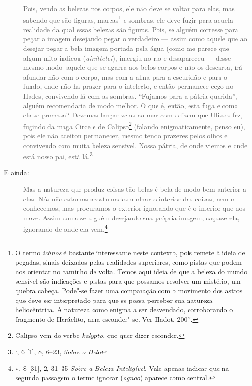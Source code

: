 \begin{quote}
Pois, vendo as belezas nos corpos, ele não deve se voltar para elas,
mas sabendo que são figuras, marcas\footnote{ O termo \emph{ichnos}
é bastante interessante neste contexto, pois remete à ideia de
pegadas, sinais deixados pelas realidades superiores, como pistas que
podem nos orientar no caminho de volta. Temos aqui ideia 
de que a beleza do mundo sensível são indicações e pistas
para que possamos resolver um mistério, um quebra cabeça. Pode"-se
fazer uma comparação com o movimento dos astros que deve ser
interpretado para que se possa perceber sua natureza heliocêntrica. A
natureza como enigma a ser desvendado, corroborando o fragmento de
Heráclito, ama esconder"-se. Ver Hadot, 2007.} e sombras,
ele deve fugir para aquela realidade da qual essas belezas são
figuras. Pois, se alguém corresse para pegar a imagem desejando pegar
o verdadeiro --- assim como aquele que ao desejar pegar a bela imagem
portada pela água (como me parece que algum mito indicou
(\emph{ainíttetai}), imergiu no rio e desapareceu --- desse mesmo
modo, aquele que se agarra aos belos corpos e não os descarta, irá
afundar não com o corpo, mas com a alma para a escuridão e para o
fundo, onde não há prazer para o intelecto, e então permanece cego no
Hades, convivendo lá com as sombras. “Fujamos para a pátria querida”,
alguém recomendaria de modo melhor. O que é, então, esta fuga e como
ela se processa? Devemos lançar velas ao mar como dizem que Ulisses
fez, fugindo da maga Circe e de Calipso\footnote{ Calipso vem do
verbo \emph{kalypto}, que quer dizer esconder.} (falando
enigmaticamente, penso eu), pois ele não aceitou permanecer, mesmo
tendo prazeres pelos olhos e convivendo com muita beleza sensível.
Nossa pátria, de onde viemos e onde está nosso pai, está lá.\footnote{
	\textsc{i}, 6 [1], 8, 6--23, \emph{Sobre o Belo}}
\end{quote}

E ainda:


\begin{quote}
Mas a natureza que produz coisas tão belas é bela de modo bem
anterior a elas. Nós não estamos acostumados a olhar o interior das
coisas, nem o conhecemos, mas procuramos o exterior ignorando que é o
interior que nos move. Assim como se alguém desejando sua própria
imagem, caçasse ela, ignorando de onde ela vem.\footnote{ \textsc{v}, 8 [31], 2,
31--35 \emph{Sobre a Beleza Inteligível}.  Vale apenas indicar que na segunda
passagem o termo ignorar (\emph{agnoo}) aparece como central.}
\end{quote}

